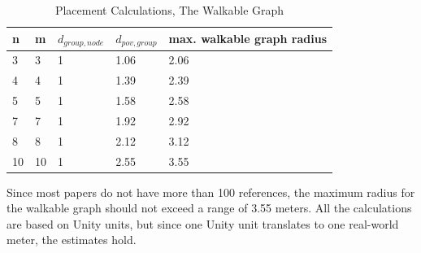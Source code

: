 \documentclass[12pt,a4paper,oneside,american,parskip=half]{article}
\begin{document}
\begin{justify}
\begin{normalsize}
\begin{table}[h]
\centering
\caption{Placement Calculations, The Walkable Graph}
\begin{tabular}{|l|l|l|l|l|} 
\hline
n & m & \textbf{$d_{group, node}$} & \textbf{$d_{pov, group}$} & max. walkable graph radius  \\ 
\hline
3          & 3          & 1                           & 1.06                        &  2.06                       \\ 
\hline
4          & 4          & 1                           & 1.39                          & 2.39                                  \\ 
\hline
5          & 5          & 1                           & 1.58                       & 2.58                               \\ 
\hline
7          & 7          & 1                           & 1.92                      & 2.92                                 \\ 
\hline
8          & 8          & 1                           & 2.12                       & 3.12                                 \\ 
\hline
10         & 10         & 1                        & 2.55                       & 3.55                              \\ 
\hline
\end{tabular}
\end{table}

Since most papers do not have more than 100 references, the maximum radius for the walkable graph should not exceed a range of 3.55 meters. All the calculations are based on Unity units, but since one Unity unit translates to one real-world meter, the estimates hold.


\end{normalsize}
\end{justify}
\end{document}
